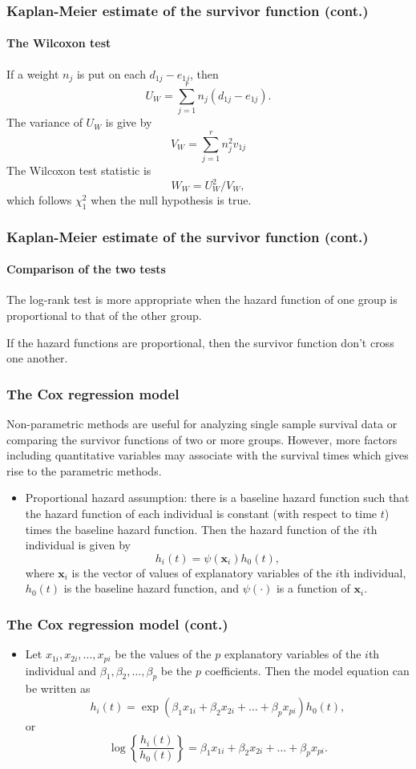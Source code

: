 \documentclass{beamer}
\begin{document}
	\begin{frame}
		\frametitle{Kaplan-Meier estimate of the survivor function (cont.)}
		\framesubtitle{The Wilcoxon test}
		If a weight $n_j$ is put on each $d_{ 1j } - e_{ 1j }$, then
		\[ U_W = \sum_{ j = 1 }^{ r } n_j( d_{ 1j } - e_{ 1j } ). \]
		The variance of $U_W$ is give by
		\[ V_W = \sum_{ j = 1 }^{ r } n_j^2 v_{ 1j } \]
		The Wilcoxon test statistic is 
		\[ W_W = U_W^2 / V_W, \]
		which follows $\chi^2_1$ when the null hypothesis is true.
	\end{frame}
	
	\begin{frame}
		\frametitle{Kaplan-Meier estimate of the survivor function (cont.)}
		\framesubtitle{Comparison of the two tests}
		The log-rank test is more appropriate when the hazard function of one group is proportional to that of the other group.
		
		If the hazard functions are proportional, then the survivor function don't cross one another.
	\end{frame}
	
	\begin{frame}
		\frametitle{The Cox regression model}
		Non-parametric methods are useful for analyzing single sample survival data or comparing the survivor functions of two or more groups. However, more factors including quantitative variables may associate with the survival times which gives rise to the parametric methods.
		\begin{itemize}
			\item Proportional hazard assumption:
			there is a baseline hazard function such that the hazard function of each individual is constant (with respect to time $t$) times the baseline hazard function.
			Then the hazard function of the $i$th individual is given by
			\[ h_i( t ) = \psi( \pmb{ x }_i )h_0( t ), \]
			where $\pmb{ x }_i$ is the vector of values of explanatory variables of the $i$th individual, $h_0( t )$ is the baseline hazard function, and $\psi( \cdot )$ is a function of $\pmb{ x }_i$.  
		\end{itemize}
	\end{frame}
	
	\begin{frame}
		\frametitle{The Cox regression model (cont.)}
		\begin{itemize}
			\item Let $x_{ 1i }, x_{ 2i }, \dots, x_{ pi }$ be the values of the $p$ explanatory variables of the $i$th individual and $\beta_1, \beta_2, \dots, \beta_p$ be the $p$ coefficients. Then the model equation can be written as
			\[ h_i( t ) = \exp( \beta_1 x_{ 1i } + \beta_2 x_{ 2i } + \dots + \beta_p x_{ pi } ) h_0( t ) ,\]
			or
			\[ \log \left\{ \frac{ h_i( t ) }{ h_0( t ) } \right\} = \beta_1 x_{ 1i } + \beta_2 x_{ 2i } + \dots + \beta_p x_{ pi }. \]
		\end{itemize}
	\end{frame}
	
\end{document}
